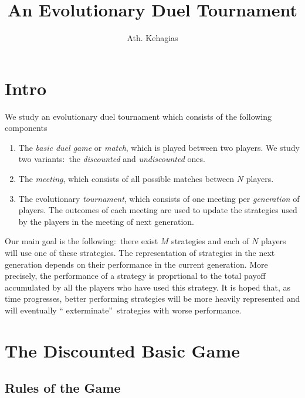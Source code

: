 \documentclass{article}%
\numberwithin{equation}{section}
\begin{document}
\title{An Evolutionary Duel Tournament}
\author{Ath. Kehagias }
\date{}
\maketitle

\section{Intro}

We study an evolutionary duel tournament which consists of the following components

\begin{enumerate}
\item The \emph{basic duel game} or \emph{match}, which is played between two
players. We study two variants:\ the \emph{discounted} and \emph{undiscounted} ones.

\item The \emph{meeting}, which consists of all possible matches between $N$ players.

\item The evolutionary \emph{tournament}, which consists of one meeting per
\emph{generation} of players. The outcomes of each meeting are used to update
the strategies used by the players in the meeting of next generation.
\end{enumerate}

Our main goal is the following:\ there exist $M$ strategies and each of $N$
players will use one of these strategies. The representation of strategies in
the next generation depends on their performance in the current generation.
More precisely, the performance of a strategy is proprtional to the total
payoff accumulated by all the players who have used this strategy. It is hoped
that, as time progresses, better performing strategies will be more heavily
represented and will eventually \textquotedblleft
exterminate\textquotedblright\ strategies with worse performance.

\section{The Discounted Basic Game}

\subsection{Rules of the Game\noindent}
\end{document}
